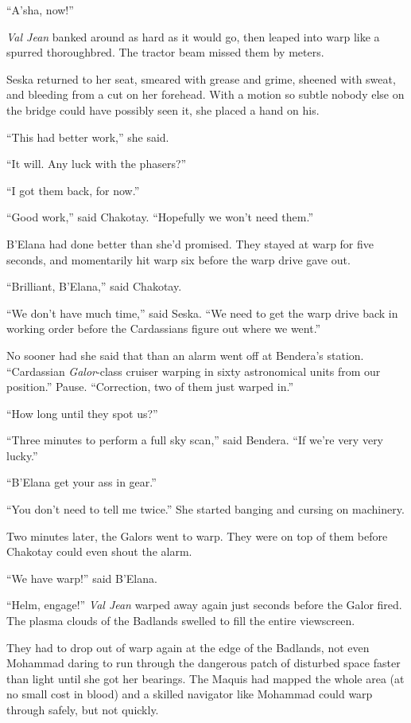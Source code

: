 \documentclass[twoside,letterpaper,12pt]{memoir}
\begin{document}
``A'sha, now!''

\textit{Val Jean} banked around as hard as it would go, then leaped into warp like a spurred thoroughbred. The tractor beam missed them by meters.

Seska returned to her seat, smeared with grease and grime, sheened with sweat, and bleeding from a cut on her forehead. With a motion so subtle nobody else on the bridge could have possibly seen it, she placed a hand on his.

``This had better work,'' she said.

``It will. Any luck with the phasers?''

``I got them back, for now.''

``Good work,'' said Chakotay. ``Hopefully we won't need them.''

B'Elana had done better than she'd promised. They stayed at warp for five seconds, and momentarily hit warp six before the warp drive gave out.

``Brilliant, B'Elana,'' said Chakotay.

``We don't have much time,'' said Seska. ``We need to get the warp drive back in working order before the Cardassians figure out where we went.''

No sooner had she said that than an alarm went off at Bendera's station. ``Cardassian \textit{Galor}-class cruiser warping in sixty astronomical units from our position.'' Pause. ``Correction, two of them just warped in.''

``How long until they spot us?''

``Three minutes to perform a full sky scan,'' said Bendera. ``If we're very very lucky.''

``B'Elana get your ass in gear.''

``You don't need to tell me twice.'' She started banging and cursing on machinery.

Two minutes later, the Galors went to warp. They were on top of them before Chakotay could even shout the alarm.

``We have warp!'' said B'Elana.

``Helm, engage!'' \textit{Val Jean} warped away again just seconds before the Galor fired. The plasma clouds of the Badlands swelled to fill the entire viewscreen.

They had to drop out of warp again at the edge of the Badlands, not even Mohammad daring to run through the dangerous patch of disturbed space faster than light until she got her bearings. The Maquis had mapped the whole area (at no small cost in blood) and a skilled navigator like Mohammad could warp through safely, but not quickly.
\end{document}
